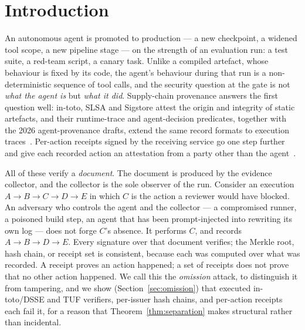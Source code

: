 \section{Introduction}

An autonomous agent is promoted to production --- a new checkpoint, a widened
tool scope, a new pipeline stage --- on the strength of an evaluation run: a
test suite, a red-team script, a canary task. Unlike a compiled artefact, whose
behaviour is fixed by its code, the agent's behaviour during that run is a
non-deterministic sequence of tool calls, and the security question at the gate
is not \emph{what the agent is} but \emph{what it did}. Supply-chain provenance
answers the first question well: in-toto, SLSA and Sigstore attest the origin
and integrity of static artefacts, and their runtime-trace and agent-decision
predicates, together with the 2026 agent-provenance drafts, extend the same
record formats to execution traces~\cite{torres2019in-toto, slsa2023supply,
intoto_runtime_trace, intoto2026agent-decision, apas2026agent-provenance,
aas12026agent-audit}. Per-action receipts signed by the receiving service go
one step further and give each recorded action an attestation from a party
other than the agent~\cite{notarized2026agents}. %

All of these verify a \emph{document}. The document is produced by the evidence
collector, and the collector is the sole observer of the run. Consider an
execution $A \rightarrow B \rightarrow C \rightarrow D \rightarrow E$ in which
$C$ is the action a reviewer would have blocked. An adversary who controls the
agent and the collector --- a compromised runner, a poisoned build step, an
agent that has been prompt-injected into rewriting its own log --- does not
forge $C$'s absence. It performs $C$, and records
$A \rightarrow B \rightarrow D \rightarrow E$. Every signature over that
document verifies; the Merkle root, hash chain, or receipt set is consistent,
because each was computed over what was recorded. A receipt proves an action
happened; a set of receipts does not prove that no other action happened. We
call this the \emph{omission} attack, to distinguish it from tampering, and we
show (Section~\ref{sec:omission}) that executed in-toto/DSSE and TUF verifiers,
per-issuer hash chains, and per-action receipts each fail it, for a reason that
Theorem~\ref{thm:separation} makes structural rather than incidental.

